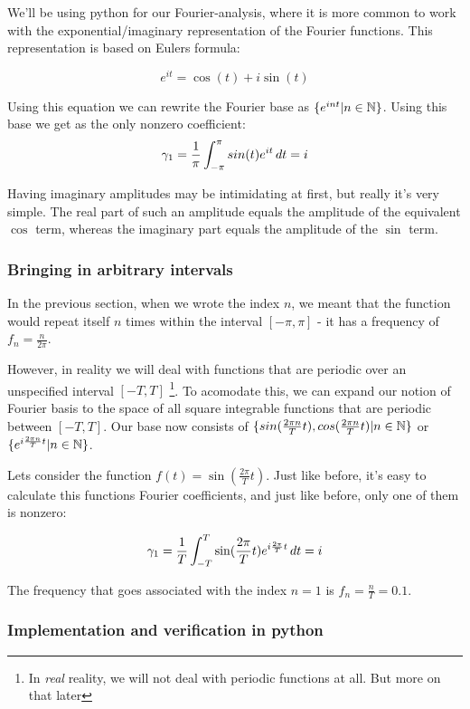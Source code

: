 We'll be using python for our Fourier-analysis, where it is more common to work with the exponential/imaginary representation of the Fourier functions. This representation is based on Eulers formula: 

$$ e^{it} = \cos(t) + i\sin(t)$$

Using this equation we can rewrite the Fourier base as $\{e^{int} | n \in \mathbb{N} \}$.
 Using this base we get as the only nonzero coefficient: 
 $$ \gamma_1 = \frac{1}{\pi} \int_{-\pi}^\pi sin(t) e^{it} \mathop{dt} = i $$

Having imaginary amplitudes may be intimidating at first, but really it's very simple. The real part of such an amplitude equals the amplitude of the equivalent $\cos$ term, whereas the imaginary part equals the amplitude of the $\sin$ term. 

\subsubsection{Bringing in arbitrary intervals}

In the previous section, when we wrote the index $n$, we meant that the function would repeat itself $n$ times within the interval $[-\pi, \pi]$ - it has a frequency of $f_n = \frac{n}{2\pi}$.

However, in reality we will deal with functions that are periodic over an unspecified interval $[-T,T]$ \footnote{In \emph{real} reality, we will not deal with periodic functions at all. But more on that later}. To acomodate this, we can expand our notion of Fourier basis to the space of all square integrable functions that are periodic between $[-T, T]$. Our base now consists of $\{sin(\frac{2 \pi n}{T} t), cos(\frac{2 \pi n}{T} t) | n \in \mathbb{N} \}$ or $\{ e^{i \frac{2 \pi n}{T} t} | n \in \mathbb{N} \}$.

Lets consider the function $f(t) = \sin(\frac{2\pi}{T}t)$. Just like before, it's easy to calculate this functions Fourier coefficients, and just like before, only one of them is nonzero: 

$$ \gamma_1 = \frac{1}{T} \int_{-T}^T \sin(\frac{2\pi}{T} t) e^{i \frac{2 \pi}{T} t} \mathop{dt} = i$$

The frequency that goes associated with the index $n=1$ is $f_n = \frac{n}{T} = 0.1$. 

\subsubsection{Implementation and verification in python}

